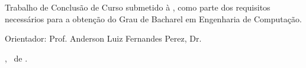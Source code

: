 \documentclass{ufscThesis} %
\begin{document}
\capa  

\begin{titlepage}
	\vfill
	\begin{center}
		\ABNTautordata \\[5cm]
		
		\tituloformat{\ABNTtitulodata} \\[1cm]
		
		\hspace{.45\textwidth} %
		\begin{minipage}{.5\textwidth}
			\begin{espacosimples}
				
				Trabalho de Conclusão de Curso submetido à \ABNTinstituicaodata,
				como parte dos requisitos necessários para a obtenção do Grau de
				Bacharel em Engenharia de Computação.
				
				Orientador: Prof. Anderson Luiz Fernandes Perez, Dr.
			\end{espacosimples}
		\end{minipage}
		\vfill \localformat \ABNTlocaldata, \mesdata\ de \anodata.
	\end{center}
	\vspace{1cm}
\end{titlepage}

\paginaresumo
\listadefiguras %
\listadetabelas 
\listadeabreviaturas
\sumario








\end{document}
